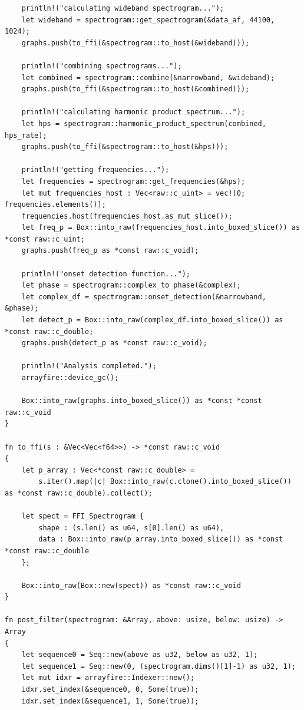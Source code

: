\documentclass[a4paper,12pt]{report}
\begin{document}
\begin{verbatim}
    println!("calculating wideband spectrogram...");
    let wideband = spectrogram::get_spectrogram(&data_af, 44100, 1024);
    graphs.push(to_ffi(&spectrogram::to_host(&wideband)));

    println!("combining spectrograms...");
    let combined = spectrogram::combine(&narrowband, &wideband);
    graphs.push(to_ffi(&spectrogram::to_host(&combined)));    

    println!("calculating harmonic product spectrum...");
    let hps = spectrogram::harmonic_product_spectrum(combined, hps_rate);
    graphs.push(to_ffi(&spectrogram::to_host(&hps)));    

    println!("getting frequencies...");
    let frequencies = spectrogram::get_frequencies(&hps);
    let mut frequencies_host : Vec<raw::c_uint> = vec![0; frequencies.elements()];
    frequencies.host(frequencies_host.as_mut_slice());
    let freq_p = Box::into_raw(frequencies_host.into_boxed_slice()) as *const raw::c_uint;
    graphs.push(freq_p as *const raw::c_void);

    println!("onset detection function...");
    let phase = spectrogram::complex_to_phase(&complex);
    let complex_df = spectrogram::onset_detection(&narrowband, &phase);
    let detect_p = Box::into_raw(complex_df.into_boxed_slice()) as *const raw::c_double;
    graphs.push(detect_p as *const raw::c_void);

    println!("Analysis completed.");    
    arrayfire::device_gc();

    Box::into_raw(graphs.into_boxed_slice()) as *const *const raw::c_void
}

fn to_ffi(s : &Vec<Vec<f64>>) -> *const raw::c_void
{
    let p_array : Vec<*const raw::c_double> = 
        s.iter().map(|c| Box::into_raw(c.clone().into_boxed_slice()) as *const raw::c_double).collect();
        
    let spect = FFI_Spectrogram {
        shape : (s.len() as u64, s[0].len() as u64),
        data : Box::into_raw(p_array.into_boxed_slice()) as *const *const raw::c_double
    };

    Box::into_raw(Box::new(spect)) as *const raw::c_void
}

fn post_filter(spectrogram: &Array, above: usize, below: usize) -> Array
{
    let sequence0 = Seq::new(above as u32, below as u32, 1);
    let sequence1 = Seq::new(0, (spectrogram.dims()[1]-1) as u32, 1);
    let mut idxr = arrayfire::Indexer::new();            
    idxr.set_index(&sequence0, 0, Some(true));
    idxr.set_index(&sequence1, 1, Some(true));    
  

\end{verbatim}
\end{document}
